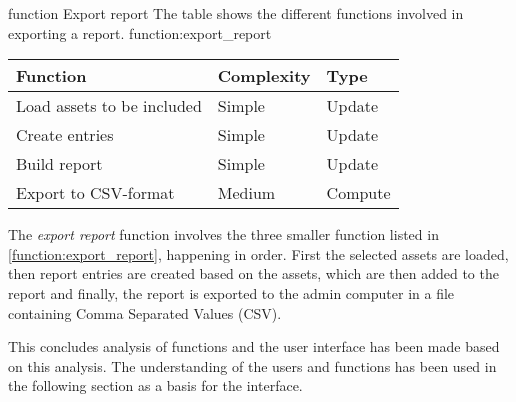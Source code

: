 \fancyLayout
    {function}
    {Export report}
    {The table shows the different functions involved in exporting a report.}
    {function:export_report}
    {
        \centering
        \begin{tabular}{|l|l|l|}
            \hline
            \textbf{Function} & \textbf{Complexity} & \textbf{Type}\\
            \hline
            \hline
            Load assets to be included & Simple & Update \\
            \hline
            Create entries & Simple & Update \\
            \hline
            Build report & Simple & Update \\
            \hline
            Export to CSV-format & Medium & Compute \\
            \hline
        \end{tabular}
}

The \textit{export report} function involves the three smaller function listed in \autoref{function:export_report}, happening in order. First the selected assets are loaded, then report entries are created based on the assets, which are then added to the report and finally, the report is exported to the admin computer in a file containing Comma Separated Values (CSV).
\par
This concludes analysis of functions and the user interface has been made based on this analysis. The understanding of the users and functions has been used in the following section as a basis for the interface.